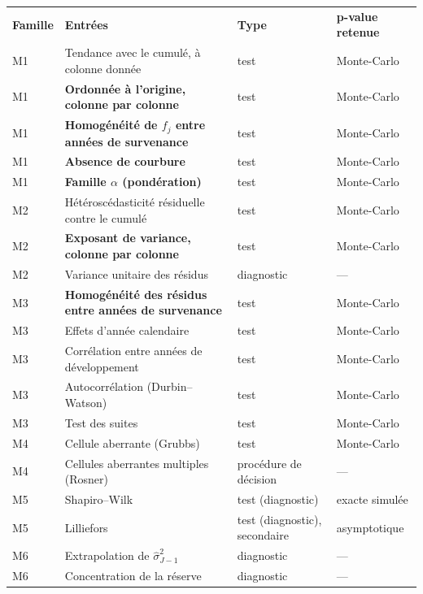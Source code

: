 \documentclass[a4paper,11pt]{article}
\begin{document}
\begin{center}
\small
{}
\begin{tabular}{@{}p{1.2cm}p{6.0cm}p{3.2cm}p{3.9cm}@{}}
\rowcolor{tableheader}
\textcolor{financeblue}{\textbf{Famille}} &
\textcolor{financeblue}{\textbf{Entrées}} &
\textcolor{financeblue}{\textbf{Type}} &
\textcolor{financeblue}{\textbf{p-value retenue}} \\
M1 & Tendance avec le cumulé, à colonne donnée & test & Monte-Carlo \\
M1 & \textbf{Ordonnée à l'origine, colonne par colonne} & test & Monte-Carlo \\
M1 & \textbf{Homogénéité de $f_j$ entre années de survenance} & test & Monte-Carlo \\
M1 & \textbf{Absence de courbure} & test & Monte-Carlo \\
M1 & \textbf{Famille $\alpha$ (pondération)} & test & Monte-Carlo \\
M2 & Hétéroscédasticité résiduelle contre le cumulé & test & Monte-Carlo \\
M2 & \textbf{Exposant de variance, colonne par colonne} & test & Monte-Carlo \\
M2 & Variance unitaire des résidus & diagnostic & --- \\
M3 & \textbf{Homogénéité des résidus entre années de survenance} & test & Monte-Carlo \\
M3 & Effets d'année calendaire & test & Monte-Carlo \\
M3 & Corrélation entre années de développement & test & Monte-Carlo \\
M3 & Autocorrélation (Durbin--Watson) & test & Monte-Carlo \\
M3 & Test des suites & test & Monte-Carlo \\
M4 & Cellule aberrante (Grubbs) & test & Monte-Carlo \\
M4 & Cellules aberrantes multiples (Rosner) & procédure de décision & --- \\
M5 & Shapiro--Wilk & test (diagnostic) & exacte simulée \\
M5 & Lilliefors & test (diagnostic), secondaire & asymptotique \\
M6 & Extrapolation de $\hat\sigma^2_{J-1}$ & diagnostic & --- \\
M6 & Concentration de la réserve & diagnostic & --- \\
\end{tabular}
\end{center}
\end{document}
